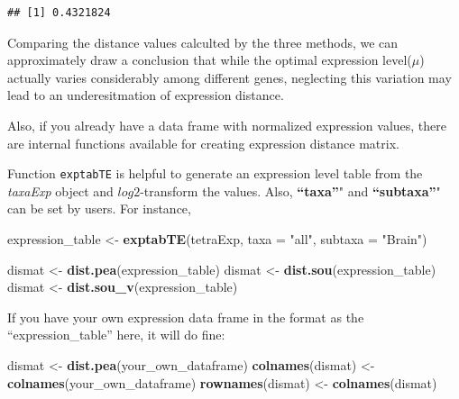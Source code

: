 \documentclass[]{book}
\newenvironment{Shaded}{\begin{snugshade}}{\end{snugshade}}
\newcommand{\DataTypeTok}[1]{\textcolor[rgb]{0.13,0.29,0.53}{#1}}
\newcommand{\KeywordTok}[1]{\textcolor[rgb]{0.13,0.29,0.53}{\textbf{#1}}}
\newcommand{\NormalTok}[1]{#1}
\newcommand{\OperatorTok}[1]{\textcolor[rgb]{0.81,0.36,0.00}{\textbf{#1}}}
\newcommand{\StringTok}[1]{\textcolor[rgb]{0.31,0.60,0.02}{#1}}
\begin{document}
\begin{Shaded}
\end{Shaded}

\begin{verbatim}
## [1] 0.4321824
\end{verbatim}

Comparing the distance values calculted by the three methods, we can approximately draw a conclusion that while the optimal expression level(\(\mu\)) actually varies considerably among different genes, neglecting this variation may lead to an underesitmation of expression distance.

Also, if you already have a data frame with normalized expression values, there are internal functions available for creating expression distance matrix.

Function \texttt{exptabTE} is helpful to generate an expression level table from the \emph{taxaExp} object and \(log2\)-transform the values. Also, \textbf{``taxa''}" and \textbf{``subtaxa''}" can be set by users.
For instance,

\begin{Shaded}
\begin{Highlighting}[]
\NormalTok{expression_table <-}\StringTok{ }\KeywordTok{exptabTE}\NormalTok{(tetraExp, }\DataTypeTok{taxa =} \StringTok{"all"}\NormalTok{,}
                            \DataTypeTok{subtaxa =} \StringTok{"Brain"}\NormalTok{)}

\NormalTok{dismat <-}\StringTok{ }\KeywordTok{dist.pea}\NormalTok{(expression_table)}
\NormalTok{dismat <-}\StringTok{ }\KeywordTok{dist.sou}\NormalTok{(expression_table)}
\NormalTok{dismat <-}\StringTok{ }\KeywordTok{dist.sou_v}\NormalTok{(expression_table)}
\end{Highlighting}
\end{Shaded}

If you have your own expression data frame in the format as the ``expression\_table'' here, it will do fine:

\begin{Shaded}
\begin{Highlighting}[]
\NormalTok{dismat <-}\StringTok{ }\KeywordTok{dist.pea}\NormalTok{(your_own_dataframe)}
\KeywordTok{colnames}\NormalTok{(dismat) <-}\StringTok{ }\KeywordTok{colnames}\NormalTok{(your_own_dataframe)}
\KeywordTok{rownames}\NormalTok{(dismat) <-}\StringTok{ }\KeywordTok{colnames}\NormalTok{(dismat)}
\end{Highlighting}
\end{Shaded}
\end{document}
